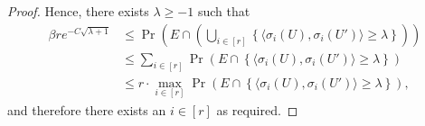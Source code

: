 \begin{proof}
  Hence, there exists $\lambda \ge -1$ such that
  \begin{align}\label{eq:max:big:and:E}
    \beta r e^{-C\sqrt{\lambda + 1}} &\le \Pr\left(E \cap \left( \bigcup_{i \in [r]} \left\{ \big\langle \sigma_i(U),\sigma_i(U') \big\rangle \ge \lambda \right\}\right)   \right) \\
    &\le \sum_{i \in [r]} \Pr\left(E \cap \left\{ \big\langle \sigma_i(U),\sigma_i(U') \big\rangle \ge \lambda \right\} \right)\\
    &\le r \cdot \max_{i \in [r]} \Pr\left(E \cap \left\{ \big\langle \sigma_i(U),\sigma_i(U') \big\rangle \ge \lambda \right\} \right) ,
  \end{align}
  and therefore there exists an $i \in [r]$ as required.
\end{proof}